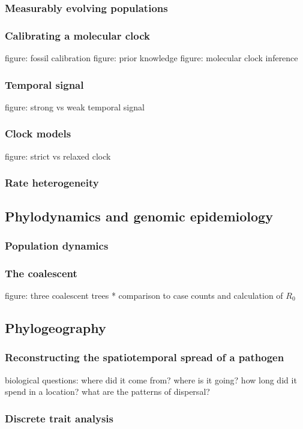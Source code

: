       \subsubsection{Measurably evolving populations}
      \subsubsection{Calibrating a molecular clock}
      figure: fossil calibration
      figure: prior knowledge
      figure: molecular clock inference
      \subsubsection{Temporal signal}
      figure: strong vs weak temporal signal
      \subsubsection{Clock models}
      figure: strict vs relaxed clock
      \subsubsection{Rate heterogeneity}
    \subsection{Phylodynamics and genomic epidemiology}
      \subsubsection{Population dynamics}
      \subsubsection{The coalescent}
      figure: three coalescent trees *
      comparison to case counts and calculation of $R_0$

    \subsection{Phylogeography}

      \subsubsection{Reconstructing the spatiotemporal spread of a pathogen}
      biological questions: where did it come from? where is it going? how long did it spend in a location? what are the patterns of dispersal?
      \subsubsection{Discrete trait analysis}

